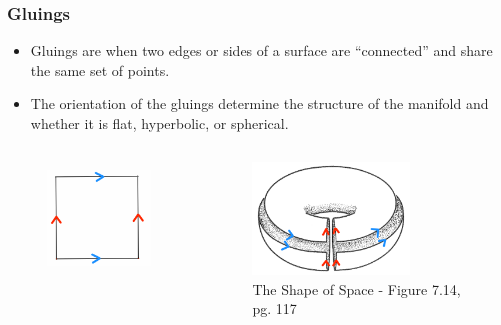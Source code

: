 \documentclass[13pt]{beamer}
\begin{document}
\begin{frame}
\frametitle{Gluings}
	\begin{itemize}
    \item \alert{Gluings} are when two edges or sides of a surface are ``connected'' and share the same set of points.
		\item The orientation of the gluings determine the structure of the manifold and whether it is flat, hyperbolic, or spherical.
	\end{itemize}

  \begin{columns}[r] %
     \centering
      \begin{figure}
        \includegraphics[height=3cm]{./img/torusgluing}
      \end{figure}
     \centering
      \begin{figure}
        \includegraphics[height=3cm]{./img/torusconstruction}
        \caption{The Shape of Space - Figure 7.14, pg. 117}
      \end{figure}
  \end{columns}
\end{frame}
\end{document}
